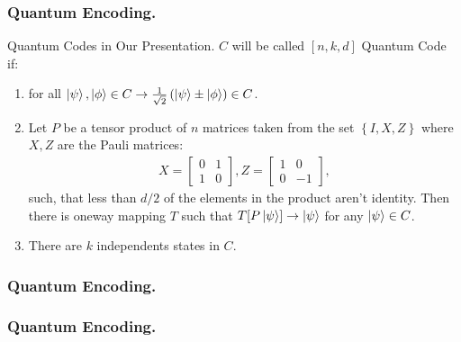 \documentclass[usenames, aspectratio=169]{beamer}
\theoremstyle{claim}
\theoremstyle{remark}
\begin{document}
 \begin{frame}
   \frametitle{Quantum Encoding.}
   \begin{block}{Quantum Codes in Our Presentation.}
     $C$ will be called $[n,k,d]$ Quantum Code if:
     \begin{enumerate}
       \item  for all $\ket{\psi},\ket{\phi} \in C \rightarrow \frac{1}{\sqrt{2}}\left( \ket{\psi} \pm \ket{\phi} \right) \in C$.
       \item Let $P$ be a tensor product of $n$ matrices taken from the set $\left\{ I, X, Z \right\}$ where $X,Z$ are the Pauli matrices: 
         \begin{equation*}
           \begin{split}
             X = \begin{bmatrix}
               0 & 1 \\
               1 & 0
             \end{bmatrix}, Z = \begin{bmatrix}
               1 & 0 \\
               0 & -1
             \end{bmatrix},
           \end{split}
         \end{equation*} such, that less than $d/2$ of the elements in the product aren't identity. Then there is oneway mapping $T$ such that $T[P\ket{\psi}] \rightarrow \ket{\psi}$ for any $\ket{\psi} \in C$.   
       \item There are $k$ independents states in $C$.  
     \end{enumerate}
   \end{block}
\end{frame}
 \begin{frame}
   \frametitle{Quantum Encoding.}
\end{frame}
 \begin{frame}
   \frametitle{Quantum Encoding.}
\end{frame}
\end{document}
